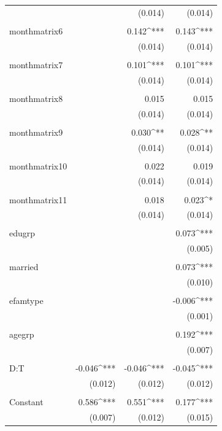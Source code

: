 \documentclass{article}
\begin{document}
\begin{enumerate}[label=(\alph*)]
\begin{center}
\begin{longtable}{lD{.}{.}{-3} D{.}{.}{-3} D{.}{.}{-3} }
			  &  & (0.014) & (0.014) \\ 
			  & & & \\ 
			 monthmatrix6 &  & 0.142^{***} & 0.143^{***} \\ 
			  &  & (0.014) & (0.014) \\ 
			  & & & \\ 
			 monthmatrix7 &  & 0.101^{***} & 0.101^{***} \\ 
			  &  & (0.014) & (0.014) \\ 
			  & & & \\ 
			 monthmatrix8 &  & 0.015 & 0.015 \\ 
			  &  & (0.014) & (0.014) \\ 
			  & & & \\ 
			 monthmatrix9 &  & 0.030^{**} & 0.028^{**} \\ 
			  &  & (0.014) & (0.014) \\ 
			  & & & \\ 
			 monthmatrix10 &  & 0.022 & 0.019 \\ 
			  &  & (0.014) & (0.014) \\ 
			  & & & \\ 
			 monthmatrix11 &  & 0.018 & 0.023^{*} \\ 
			  &  & (0.014) & (0.014) \\ 
			  & & & \\ 
			 edugrp &  &  & 0.073^{***} \\ 
			  &  &  & (0.005) \\ 
			  & & & \\ 
			 married &  &  & 0.073^{***} \\ 
			  &  &  & (0.010) \\ 
			  & & & \\ 
			 efamtype &  &  & -0.006^{***} \\ 
			  &  &  & (0.001) \\ 
			  & & & \\ 
			 agegrp &  &  & 0.192^{***} \\ 
			  &  &  & (0.007) \\ 
			  & & & \\ 
			 D:T & -0.046^{***} & -0.046^{***} & -0.045^{***} \\ 
			  & (0.012) & (0.012) & (0.012) \\ 
			  & & & \\ 
			 Constant & 0.586^{***} & 0.551^{***} & 0.177^{***} \\ 
			  & (0.007) & (0.012) & (0.015) \\ 

\end{longtable}
\end{center}
\end{enumerate}
\end{document}
